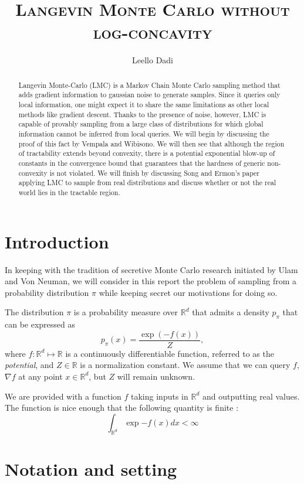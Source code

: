 \documentclass[11pt,twoside]{article}
\title{\textsc{Langevin Monte Carlo without log-concavity}}
\author{Leello Dadi}
\date{}
\newcommand{\R}{\mathbb{R}}
\begin{document}
\maketitle

\begin{abstract}
    Langevin Monte-Carlo (LMC) is a Markov Chain Monte Carlo sampling method that adds gradient information to gaussian noise to generate samples. Since it queries only local information, one might expect it to share the same limitations as other local methods like gradient descent. Thanks to the presence of noise, however, LMC is capable of provably sampling from a large class of distributions for which global information cannot be inferred from local queries. We will begin by discussing the proof of this fact by Vempala and Wibisono. We will then see that although the region of tractability extends beyond convexity, there is a potential exponential blow-up of constants in the convergence bound that guarantees that the hardness of generic non-convexity is not violated.  We will finish by discussing Song and Ermon's paper applying LMC to sample from real distributions and discuss whether or not the real world lies in the tractable region.
\end{abstract}

\section{Introduction}

In keeping with the tradition of secretive Monte Carlo research initiated by Ulam and Von Neuman, we will consider in this report the problem of sampling from a probability distribution $\pi$ while keeping secret our motivations for doing so. 

The distribution $\pi$ is a probability measure over $\R^d$ that admits a density $p_\pi$ that can be expressed as
\[
p_\pi(x) = \frac{\exp{\left(-f(x)\right)}}{Z},
\]
where $f: \R^d \mapsto \R$ is a continuously differentiable function, referred to as the \textit{potential}, and $Z \in \R$ is a normalization constant. We assume that we can query $f$, $\nabla f$ at any point $x \in \R^d$, but $Z$ will remain unknown.

We are provided with a function $f$ taking inputs in $\R^d$ and outputting real values. The function is nice enough that the following quantity is finite :
\[
\int_{\R^d}\exp{-f(x)}dx < \infty
\]

\section{Notation and setting}
\end{document}
